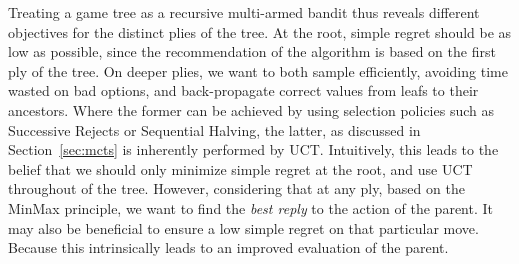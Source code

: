 \documentclass[a4paper]{llncs}
\begin{document}
Treating a game tree as a recursive multi-armed bandit thus reveals different objectives for the distinct plies of the tree. At the root, simple regret should be as low as possible, since the recommendation of the algorithm is based on the first ply of the tree. On deeper plies, we want to both sample efficiently, avoiding time wasted on bad options, and back-propagate correct values from leafs to their ancestors. Where the former can be achieved by using selection policies such as Successive Rejects or Sequential Halving, the latter, as discussed in Section~\ref{sec:mcts} is inherently performed by UCT. Intuitively, this leads to the belief that we should only minimize simple regret at the root, and use UCT throughout of the tree. However, considering that at any ply, based on the MinMax principle, we want to find the \emph{best reply} to the action of the parent. It may also be beneficial to ensure a low simple regret on that particular move. Because this intrinsically leads to an improved evaluation of the parent.
\end{document}
